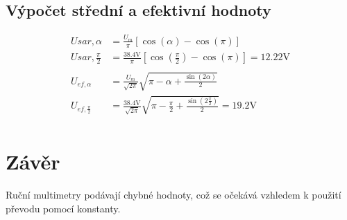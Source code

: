 \documentclass{article}
\begin{document}
\subsection{Výpočet střední a efektivní hodnoty}

$$
\begin{aligned}
	U{sar,\alpha}&=\frac{U_m}{\pi}[\cos(\alpha)-\cos(\pi)]\\
	U{sar,\frac{\pi}{2}}&=\frac{38.4 \si{\volt}}{\pi}[\cos(\frac{\pi}{2})-\cos(\pi)] = 12.22 \si{\volt}\\
	\\
	U_{ef,\alpha} &= \frac{U_m}{\sqrt{2\pi}}\sqrt{\pi-\alpha+\frac{\sin(2\alpha)}{2}}\\
	U_{ef,\frac{\pi}{2}} &= \frac{38.4 \si{\volt}}{\sqrt{2\pi}}\sqrt{\pi-\frac{\pi}{2}+\frac{\sin(2\frac{\pi}{2})}{2}} = 19.2 \si{\volt}\\
\end{aligned}
$$

\section{Závěr}
Ruční multimetry podávají chybné hodnoty, což se očekává vzhledem k použití převodu pomocí konstanty.
\end{document}
